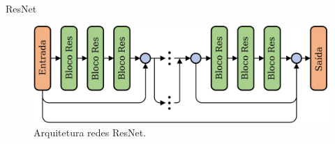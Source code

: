 \documentclass{beamer}
\begin{document}
\begin{frame}{ResNet}

    \begin{figure}[!ht]
        \centering
        \includegraphics[width=0.9\columnwidth]{Imagens/An-illustration-of-the-deep-residual-network-ResNet-structure-More-shortcut.jpg}
        \caption{ Arquitetura redes ResNet.}
       \label{fig:ResNet-Rsp}
    \end{figure}
\end{frame}
\end{document}
